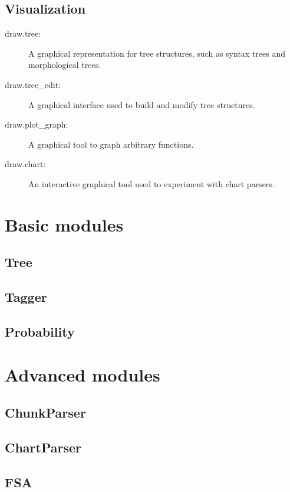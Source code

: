\documentclass[11pt]{article}
\begin{document}
\subsection*{Visualization}

\begin{description}
\item[draw.tree:] A graphical representation for tree
      structures, such as syntax trees and morphological trees. 
\item[draw.tree\_edit:] A graphical interface used to
      build and modify tree structures.
\item[draw.plot\_graph:] A graphical tool to graph
      arbitrary functions.
\item[draw.chart:] An interactive graphical tool used to
      experiment with chart parsers.
\end{description}

\section{Basic modules}

\subsection{Tree}

\subsection{Tagger}

\subsection{Probability}

\section{Advanced modules}

\subsection{ChunkParser}

\subsection{ChartParser}

\subsection{FSA}
\end{document}
